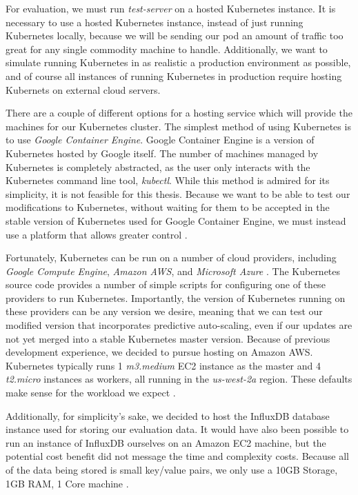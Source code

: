 For evaluation, we must run \textit{test-server} on a hosted Kubernetes
instance. It is necessary to use a hosted Kubernetes instance, instead of just
running Kubernetes locally, because we will be sending our pod an amount of
traffic too great for any single commodity machine to handle. Additionally, we
want to simulate running Kubernetes in as realistic a production environment as
possible, and of course all instances of running Kubernetes in production
require hosting Kubernets on external cloud servers.

There are a couple of different options for a hosting service which will provide
the machines for our Kubernetes cluster. The simplest method
of using Kubernetes is to use \textit{Google Container
Engine}. Google Container Engine is a version of Kubernetes hosted by Google
itself. The number of machines managed by Kubernetes is completely abstracted,
as the user only interacts with the Kubernetes command line tool,
\textit{kubectl}. While this method is admired for its simplicity, it is not
feasible for this thesis. Because we want to be able to test our modifications
to Kubernetes, without waiting for them to be accepted in the stable version of
Kubernetes used for Google Container Engine, we must instead use a platform that
allows greater control \cite{getting-started-k8s}.

Fortunately, Kubernetes can be run on a number of cloud providers, including
\textit{Google Compute Engine}, \textit{Amazon AWS}, and \textit{Microsoft
Azure} \cite{getting-started-k8s}.
The Kubernetes source code provides a number of simple scripts for
configuring one of these providers to run Kubernetes. Importantly, the version
of Kubernetes running on these providers can be any version we desire, meaning
that we can test our modified version that incorporates predictive auto-scaling,
even if our updates are not yet merged into a stable Kubernetes master version.
Because of previous development experience, we decided to
pursue hosting on Amazon AWS. Kubernetes typically runs 1 \textit{m3.medium}
EC2 instance as the master and 4 \textit{t2.micro} instances as workers, all
running in the \textit{us-west-2a} region. These defaults make
sense for the workload we expect \cite{getting-started-k8s-aws}.

Additionally, for simplicity's sake, we decided to host the InfluxDB database
instance used for storing our evaluation data. It would have also been possible
to run an instance of InfluxDB ourselves on an Amazon EC2 machine, but the
potential cost benefit did not message the time and complexity costs. Because
all of the data being stored is small key/value pairs, we only use a 10GB
Storage, 1GB RAM, 1 Core machine \cite{influxdb-pricing}.
